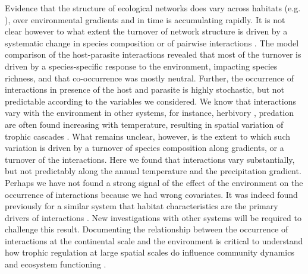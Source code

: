 \documentclass[12pt]{article}
\begin{document}
Evidence that the structure of ecological networks does vary across habitats
(e.g. \citealt{Tylianakis2007, Plein2012}), over environmental gradients
\citealt{Lurgi2010} and in time \citep{Trolsgaard2015} is accumulating
rapidly. It is not clear however to what extent the turnover of network
structure is driven by a systematic change in species composition or of
pairwise interactions \citep{Poisot2012, Poisot2015a}. The model comparison of
the host-parasite interactions revealed that most of the turnover is driven by
a species-specific response to the environment, impacting species richness,
and that co-occurrence was mostly neutral. Further, the occurrence of
interactions in presence of the host and parasite is highly stochastic, but
not predictable according to the variables we considered. We know that
interactions vary with the environment in other systems, for instance,
herbivory \citep{Shurin2012}, predation \citep{McKinnon2010, Legagneux2014}
are often found increasing with temperature, resulting in spatial variation of
trophic cascades \citep{(Gray2016}. What remains unclear, however, is the
extent to which such variation is driven by a turnover of species composition
along gradients, or a turnover of the interactions. Here we found that
interactions vary substantially, but not predictably along the annual
temperature and the precipitation gradient. Perhaps we have not found a strong
signal of the effect of the environment on the occurrence of interactions
because we had wrong covariates. It was indeed found previously for a similar
system that habitat characteristics are the primary drivers of interactions
\citep{Nyman2015}. New investigations with other systems will be required to
challenge this result. Documenting the relationship between the occurrence of
interactions at the continental scale and the environment is critical to
understand how trophic regulation at large spatial scales do influence
community dynamics and ecosystem functioning  \citep{Harfoot2013}.
\end{document}
